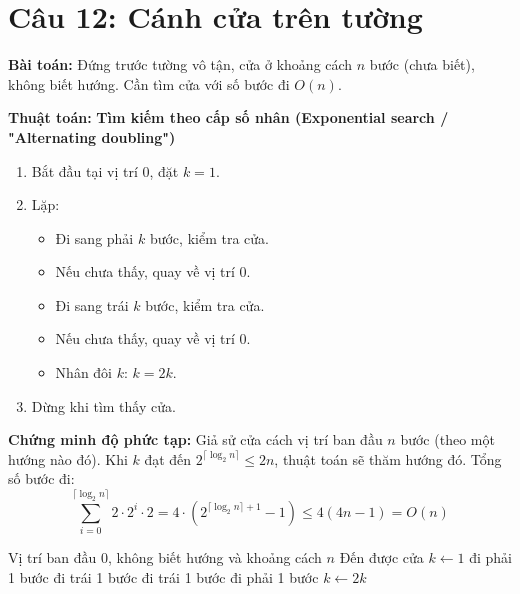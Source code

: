\documentclass[12pt,a4paper]{article}
\begin{document}
\section*{Câu 12: Cánh cửa trên tường}

\textbf{Bài toán:} Đứng trước tường vô tận, cửa ở khoảng cách $n$ bước (chưa biết), không biết hướng. Cần tìm cửa với số bước đi $O(n)$.

\textbf{Thuật toán:} \textbf{Tìm kiếm theo cấp số nhân (Exponential search / "Alternating doubling")}
\begin{enumerate}
    \item Bắt đầu tại vị trí 0, đặt $k = 1$.
    \item Lặp:
    \begin{itemize}
        \item Đi sang phải $k$ bước, kiểm tra cửa.
        \item Nếu chưa thấy, quay về vị trí 0.
        \item Đi sang trái $k$ bước, kiểm tra cửa.
        \item Nếu chưa thấy, quay về vị trí 0.
        \item Nhân đôi $k$: $k = 2k$.
    \end{itemize}
    \item Dừng khi tìm thấy cửa.
\end{enumerate}

\textbf{Chứng minh độ phức tạp:}
Giả sử cửa cách vị trí ban đầu $n$ bước (theo một hướng nào đó). Khi $k$ đạt đến $2^{\lceil \log_2 n \rceil} \le 2n$, thuật toán sẽ thăm hướng đó. Tổng số bước đi:
\[
\sum_{i=0}^{\lceil \log_2 n \rceil} 2\cdot 2^i \cdot 2 = 4 \cdot (2^{\lceil \log_2 n \rceil+1} - 1) \le 4(4n - 1) = O(n)
\]

\begin{algorithm}[H]
\caption{Tìm cửa trên tường vô tận}
\begin{algorithmic}
\REQUIRE Vị trí ban đầu 0, không biết hướng và khoảng cách $n$
\ENSURE Đến được cửa
\STATE $k \leftarrow 1$
\LOOP
     \STATE đi phải 1 bước \ENDFOR
     \RETURN \ENDIF
     \STATE đi trái 1 bước \ENDFOR
     \RETURN \ENDIF
     \STATE đi trái 1 bước \ENDFOR
     \RETURN \ENDIF
     \STATE đi phải 1 bước \ENDFOR
    \STATE $k \leftarrow 2k$
\ENDLOOP
\end{algorithmic}
\end{algorithm}
\end{document}
